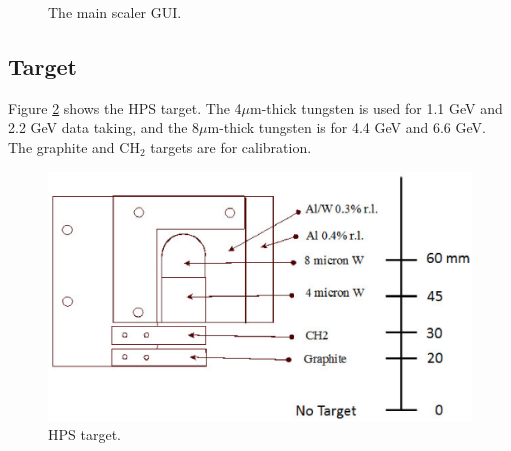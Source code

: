 \documentclass[12pt]{article}
\begin{document}
\begin{figure}[tbhp]
{\centering {} \par}
\caption{The main scaler GUI.}
 \label{fig:scaler}
\end{figure}

\clearpage

\subsection{\bf Target}

Figure \ref{target} shows the HPS target. The 4$\mu$m-thick tungsten is used for 1.1 GeV and 2.2 GeV data taking, and the 8$\mu$m-thick tungsten is for 4.4 GeV and 6.6 GeV. The graphite and CH$_2$ targets are for calibration.

\begin{figure}[ht!]
\centering
\includegraphics[width=15cm]{target.eps}
\caption{HPS target.}
\label{target}
\end{figure}
\end{document}
